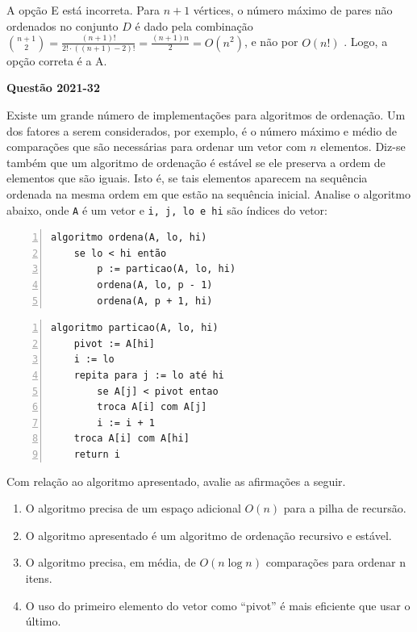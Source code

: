 \documentclass[12pt,a4paper]{article}
\newenvironment{question}[1]{%
    \pdfbookmark[3]{Questão #1}{q:#1}
    \label{q:#1}
    \bigskip\par\noindent
    \textbf{Questão #1} \dotfill
    \medskip\par\nopagebreak\noindent
    \ignorespaces
}{%
    \noindent\dotfill\medskip
}
\begin{document}
A opção E está incorreta.
Para $n+1$ vértices, o número máximo de pares não ordenados no conjunto $D$ é dado pela combinação
$\binom{n+1}{2} = \frac{(n+1)!}{2! \cdot ((n+1) - 2)!} = \frac{(n+1)n}{2} = O(n^2)$, e não por $O(n!)$ \parencite[seç.~C.1]{clrs2022}.
Logo, a opção correta é a A.

\begin{question}{2021-32}
Existe um grande número de implementações para algoritmos de ordenação.
Um dos fatores a serem considerados, por exemplo,
é o número máximo e médio de comparações que são necessárias para ordenar um vetor com $n$ elementos.
Diz-se também que um algoritmo de ordenação é estável se ele preserva a ordem de elementos que são iguais.
Isto é, se tais elementos aparecem na sequência ordenada na mesma ordem em que estão na sequência inicial.
Analise o algoritmo abaixo, onde \texttt{A} é um vetor e \texttt{i, j, lo e hi} são índices do vetor:

\medskip\noindent\begin{minipage}{\linewidth}
\begin{Verbatim}[numbers=left]
algoritmo ordena(A, lo, hi)
    se lo < hi então
        p := particao(A, lo, hi)
        ordena(A, lo, p - 1)
        ordena(A, p + 1, hi)
\end{Verbatim}

\begin{Verbatim}[numbers=left,firstnumber=last]
algoritmo particao(A, lo, hi)
    pivot := A[hi]
    i := lo
    repita para j := lo até hi
        se A[j] < pivot entao
        troca A[i] com A[j]
        i := i + 1
    troca A[i] com A[hi]
    return i
\end{Verbatim}
\medskip
\end{minipage}

Com relação ao algoritmo apresentado, avalie as afirmações a seguir.

\begin{enumerate}[label=\Roman*.]
    \item O algoritmo precisa de um espaço adicional $O(n)$ para a pilha de recursão.
    \item O algoritmo apresentado é um algoritmo de ordenação recursivo e estável.
    \item O algoritmo precisa, em média, de $O(n \log n)$ comparações para ordenar n itens.
    \item O uso do primeiro elemento do vetor como ``pivot'' é mais eficiente que usar o último.
\end{enumerate}


\end{question}
\end{document}
